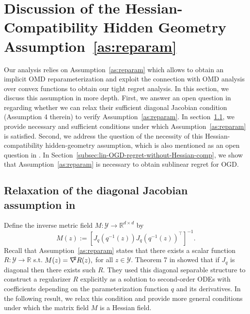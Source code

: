 \documentclass[a4paper,11pt,fullpage]{article}
\def\Y{{\mathcal Y}}
\theoremstyle{plain}
\theoremstyle{definition}
\theoremstyle{plain}
\let\nablaold\nabla
\renewcommand{\nabla}{\nablaold\mkern-2.5mu}
\begin{document}
\section{Discussion of the Hessian-Compatibility Hidden Geometry Assumption~\ref{as:reparam}}
\label{sec:discussion-hessian-comp-as}

Our analysis relies on Assumption~\ref{as:reparam} which allows 
to obtain an implicit OMD reparameterization and exploit the connection with OMD analysis over convex functions 
to obtain our tight regret analysis.  
In this section, we discuss this assumption in more depth. First, we answer an open question 
in \citet{ghai-lu-hazan22} regarding whether we can relax their sufficient diagonal Jacobian condition (Assumption 4 therein) 
to verify Assumption~\ref{as:reparam}. In section~\ref{subsec:relaxing-diag-jacobian}, we provide necessary and sufficient conditions under which Assumption~\ref{as:reparam} is satisfied. 
Second, we address the question of the necessity of this Hessian-compatibility hidden-geometry assumption, which is also mentioned as an open question in 
\citet{ghai-lu-hazan22}. In Section~\ref{subsec:lin-OGD-regret-without-Hessian-comp}, we show that Assumption~\ref{as:reparam} is necessary to obtain 
sublinear regret for OGD. 

\subsection{Relaxation of the diagonal Jacobian assumption in \citet{ghai-lu-hazan22}}
\label{subsec:relaxing-diag-jacobian}

Define the inverse metric field $M:\Y\to\mathbb R^{d\times d}$ by
\begin{equation}
\label{eq:matrix-field-M}
    M(z) := \left[ J_q(q^{-1}(z))J_q(q^{-1}(z))^\top \right]^{-1}.
\end{equation}
Recall that Assumption~\ref{as:reparam} states that there exists a scalar function $R:\Y\to\mathbb R$ s.t. $M(z)=\nabla^2 R(z),$ for all $z\in\Y.$ 
Theorem 7 in \citet{ghai-lu-hazan22} showed that if $J_q$ is diagonal then there exists such $R$. They used this diagonal separable structure  
to construct a regularizer $R$ explicitly as a solution to second-order ODEs with coefficients depending on the parameterization function $q$ and its derivatives. 
In the following result, we relax this condition and provide more general conditions under which the matrix field $M$ is a Hessian field. 
\end{document}
